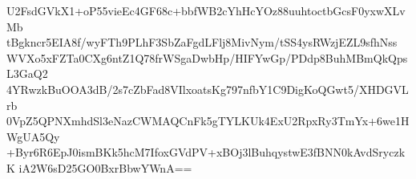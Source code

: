 U2FsdGVkX1+oP55vieEc4GF68c+bbfWB2cYhHcYOz88uuhtoctbGcsF0yxwXLvMb
tBgkncr5EIA8f/wyFTh9PLhF3SbZaFgdLFlj8MivNym/tSS4ysRWzjEZL9sfhNss
WVXo5xFZTa0CXg6ntZ1Q78frWSgaDwbHp/HIFYwGp/PDdp8BuhMBmQkQpsL3GaQ2
4YRwzkBuOOA3dB/2s7cZbFad8VIlxoatsKg797nfbY1C9DigKoQGwt5/XHDGVLrb
0VpZ5QPNXmhdSl3eNazCWMAQCnFk5gTYLKUk4ExU2RpxRy3TmYx+6we1HWgUA5Qy
+Byr6R6EpJ0ismBKk5hcM7IfoxGVdPV+xBOj3lBuhqystwE3fBNN0kAvdSryczkK
iA2W6sD25GO0BxrBbwYWnA==
